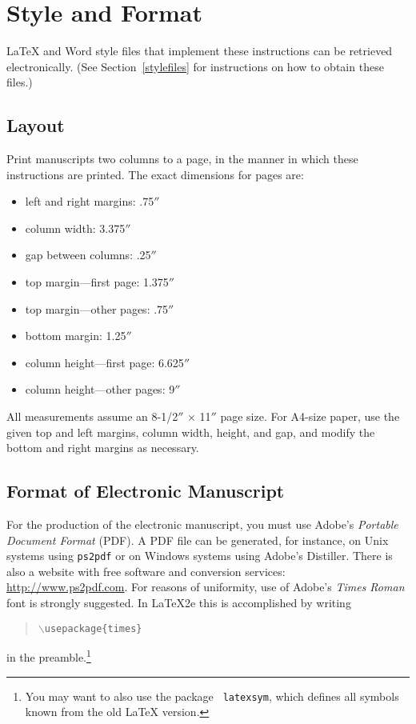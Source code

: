 \documentclass{article}
\begin{document}
\section{Style and Format}

\LaTeX{} and Word style files that implement these instructions
can be retrieved electronically. (See Section~\ref{stylefiles} for
instructions on how to obtain these files.)

\subsection{Layout}

Print manuscripts two columns to a page, in the manner in which these
instructions are printed. The exact dimensions for pages are:
\begin{itemize}
    \item left and right margins: .75$''$
    \item column width: 3.375$''$
    \item gap between columns: .25$''$
    \item top margin---first page: 1.375$''$
    \item top margin---other pages: .75$''$
    \item bottom margin: 1.25$''$
    \item column height---first page: 6.625$''$
    \item column height---other pages: 9$''$
\end{itemize}

All measurements assume an 8-1/2$''$ $\times$ 11$''$ page size. For
A4-size paper, use the given top and left margins, column width,
height, and gap, and modify the bottom and right margins as necessary.

\subsection{Format of Electronic Manuscript}

For the production of the electronic manuscript, you must use Adobe's
{\em Portable Document Format} (PDF). A PDF file can be generated, for
instance, on Unix systems using {\tt ps2pdf} or on Windows systems
using Adobe's Distiller. There is also a website with free software
and conversion services: \url{http://www.ps2pdf.com}. For reasons of
uniformity, use of Adobe's {\em Times Roman} font is strongly suggested.
In \LaTeX2e{} this is accomplished by writing
\begin{quote}
    \mbox{\tt $\backslash$usepackage\{times\}}
\end{quote}
in the preamble.\footnote{You may want to also use the package {\tt
            latexsym}, which defines all symbols known from the old \LaTeX{}
    version.}
\end{document}
